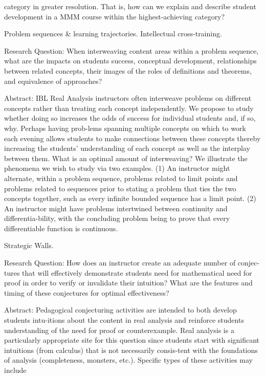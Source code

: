 \documentclass[11pt]{article}
\begin{document}
category in greater resolution. That is, how can we explain and describe student development in a MMM course within the highest-achieving category?

Problem sequences \& learning trajectories. Intellectual cross-training.

Research Question: When interweaving content areas within a problem sequence, what are the impacts on students success, conceptual development, relationships between related concepts, their images of the roles of definitions and theorems, and equivalence of approaches?

Abstract: IBL Real Analysis instructors often interweave problems on different concepts rather than treating each concept independently. We propose to study whether doing so increases the odds of success for individual students and, if so, why. Perhaps having prob-lems spanning multiple concepts on which to work each evening allows students to make connections between these concepts thereby increasing the students' understanding of each concept as well as the interplay between them. What is an optimal amount of interweaving? We illustrate the phenomena we wish to study via two examples. (1) An instructor might alternate, within a problem sequence, problems related to limit points and problems related to sequences prior to stating a problem that ties the two concepts together, such as every infinite bounded sequence has a limit point. (2) An instructor might have problems intertwined between continuity and differentia-bility, with the concluding problem being to prove that every differentiable function is continuous.

Strategic Walls.

Research Question: How does an instructor create an adequate number of conjec-tures that will effectively demonstrate students need for mathematical need for proof in order to verify or invalidate their intuition? What are the features and timing of these conjectures for optimal effectiveness?

Abstract: Pedagogical conjecturing activities are intended to both develop students intu-itions about the content in real analysis and reinforce students understanding of the need for proof or counterexample. Real analysis is a particularly appropriate site for this question since students start with significant intuitions (from calculus) that is not necessarily consis-tent with the foundations of analysis (completeness, monsters, etc.). Specific types of these activities may include
\end{document}

